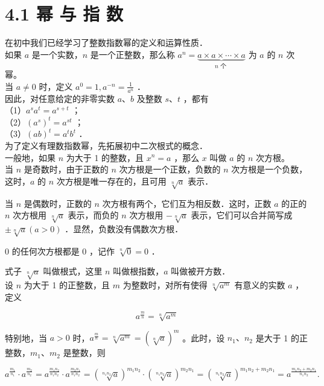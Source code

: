 \documentclass[10pt]{article}
\begin{document}
\section*{4.1 幂 与 指 数}
在初中我们已经学习了整数指数幂的定义和运算性质．\\
如果 \(a\) 是一个实数，\(n\) 是一个正整数，那么称 \(a^{n}=\underbrace{a \times a \times \cdots \times a}_{n \text { 个 }}\) 为 \(a\) 的 \(n\) 次幂。\\
当 \(a \neq 0\) 时，定义 \(a^{0}=1, a^{-n}=\frac{1}{a^{n}}\) ．\\
因此，对任意给定的非零实数 \(a 、 b\) 及整数 \(s 、 t\) ，都有\\
（1）\(a^{s} a^{t}=a^{s+t}\) ；\\
（2）\(\left(a^{s}\right)^{t}=a^{s t}\) ；\\
（3）\((a b)^{t}=a^{t} b^{t}\) ．\\
为了定义有理数指数幂，先拓展初中二次根式的概念．\\
一般地，如果 \(n\) 为大于 1 的整数，且 \(x^{n}=a\) ，那么 \(x\) 叫做 \(a\) 的 \(n\) 次方根。\\
当 \(n\) 是奇数时，由于正数的 \(n\) 次方根是一个正数，负数的 \(n\) 次方根是一个负数，这时，\(a\) 的 \(n\) 次方根是唯一存在的，且可用 \(\sqrt[n]{a}\) 表示．

当 \(n\) 是偶数时，正数的 \(n\) 次方根有两个，它们互为相反数．这时，正数 \(a\) 的正的 \(n\) 次方根用 \(\sqrt[n]{a}\) 表示，而负的 \(n\) 次方根用 \(-\sqrt[n]{a}\) 表示，它们可以合并简写成 \(\pm \sqrt[n]{a}(a>0)\) ．显然，负数没有偶数次方根．

0 的任何次方根都是 0 ，记作 \(\sqrt[n]{0}=0\) ．

式子 \(\sqrt[n]{a}\) 叫做根式，这里 \(n\) 叫做根指数，\(a\) 叫做被开方数．\\
设 \(n\) 为大于 1 的正整数，且 \(m\) 为整数时，对所有使得 \(\sqrt[n]{a^{m}}\) 有意义的实数 \(a\) ，定义

\[
a^{\frac{m}{n}}=\sqrt[n]{a^{m}}
\]

特别地，当 \(a>0\) 时，\(a^{\frac{m}{n}}=\sqrt[n]{a^{m}}=(\sqrt[n]{a})^{m}\) 。此时，设 \(n_{1} 、 n_{2}\) 是大于 1 的正整数，\(m_{1} 、 m_{2}\) 是整数，则

\[
a^{\frac{m_{1}}{n_{1}}} \cdot a^{\frac{m_{2}}{n_{2}}}=a^{\frac{m_{1} n_{2}}{n_{1} n_{2}}} \cdot a^{\frac{m_{2} n_{1}}{n_{1} n_{2}}}=(\sqrt[n_{1} n_{2}]{a})^{m_{1} n_{2}} \cdot(\sqrt[n_{1} n_{2}]{a})^{m_{2} n_{1}}=(\sqrt[n_{1} n_{2}]{a})^{m_{1} n_{2}+m_{2} n_{1}}=a^{\frac{m_{1} n_{2}+m_{2} n_{1}}{n_{1} n_{2}}} .
\]
\end{document}
